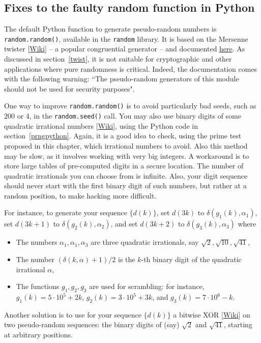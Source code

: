 \documentclass[oneside,10pt]{book}
\begin{document}
\subsection{Fixes to the faulty random function in Python}\label{fixp}

The default Python function to generate pseudo-random numbers is \texttt{random.random()}, available in the \texttt{random} library.
It is based on the \textcolor{index}{Mersenne twister} [\href{https://en.wikipedia.org/wiki/Mersenne_Twister}{Wiki}] --
a popular
 \textcolor{index}{congruential generator} --
and documented \href{https://docs.python.org/3/library/random.html}{here}. As discussed in section~\ref{twist}, it is not suitable for cryptographic and other applications where pure randomness is critical. Indeed, the documentation comes with the following warning: ``The pseudo-random generators of this module should not be used for security purposes".

One way to improve  \texttt{random.random()} is to avoid particularly bad seeds, such as $200$ or $4$, in the \texttt{random.seed()} call. You may also use binary digits of some
\textcolor{index}{quadratic irrational numbers} [\href{https://en.wikipedia.org/wiki/Quadratic_irrational_number}{Wiki}], using the Python code in section~\ref{prngpython}. Again, it is a good idea to check, using the prime test proposed in this chapter, which irrational numbers to avoid. Also this method may be slow, as it involves working with very big integers. A workaround is to store large tables of pre-computed digits in a secure location. The number of quadratic irrationals you can choose from is infinite. Also, your digit sequence
 should never start with the first binary digit of such numbers, but rather at a random position, to make hacking more difficult.

For instance, to generate your sequence $\{d(k)\}$, set $d(3k)$ to $\delta(g_1(k),\alpha_1)$, set
 $d(3k+1)$ to $\delta(g_2(k),\alpha_2)$, and set  $d(3k+2)$ to $\delta(g_3(k),\alpha_3)$ where
\begin{itemize}
\item The numbers $\alpha_1, \alpha_1, \alpha_3$ are three quadratic irrationals, say $\sqrt{2},\sqrt{10},\sqrt{41}$,
\item The number $(\delta(k,\alpha)+1)/2$ is the $k$-th binary digit of the quadratic irrational $\alpha$,
\item The functions $g_1,g_2,g_3$ are used for scrambling: for instance,
$g_1(k)=5\cdot 10^5 +2k$, $g_2(k)=3\cdot 10^5 +3k$, and $g_3(k)=7\cdot 10^6 -k$.
\end{itemize}
Another solution is to use for your sequence $\{d(k)\}$ a \textcolor{index}{bitwise XOR} [\href{https://en.wikipedia.org/wiki/Bitwise_operation}{Wiki}] on two pseudo-random sequences: the binary digits of (say) $\sqrt{2}$ and $\sqrt{41}$, starting at arbitrary positions.
\end{document}
